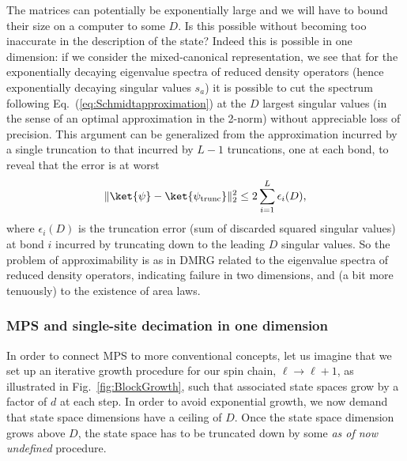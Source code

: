 The matrices can potentially be exponentially large and we will have to bound their size on a computer to some $D$. Is this possible without becoming too inaccurate in the description of the state? Indeed this is possible in one dimension: if we consider the mixed-canonical representation, we see that for the exponentially decaying eigenvalue spectra of reduced density operators (hence exponentially decaying singular values $s_a$) it is possible to cut the spectrum following Eq.~(\ref{eq:Schmidtapproximation}) at the $D$ largest singular values (in the sense of an optimal approximation in the 2-norm) without appreciable loss of precision. This argument can be generalized from the approximation incurred by a single truncation to that incurred by $L-1$ truncations, one at each bond, to reveal that the error is at worst \cite{Verstraete06}
\begin{equation}
\| \ket{\psi} - \ket{\psi_{{\rm trunc}}} \|_2^2 \leq 2 \sum_{i=1}^L \epsilon_i(D) ,
\end{equation}
where $\epsilon_i(D)$ is the truncation error (sum of discarded squared singular values) at bond $i$ incurred by truncating down to the leading $D$ singular values. So the problem of approximability is as in DMRG related to the eigenvalue spectra of reduced density operators, indicating failure in two dimensions, and (a bit more tenuously) to the existence of area laws.

\subsubsection{MPS and single-site decimation in one dimension}
\label{subsubsec:MPSsinglesitedecimation}

In order to connect MPS to more conventional concepts, let us imagine that we set up an iterative growth procedure for our spin chain, $\ell \rightarrow \ell + 1$, as illustrated in Fig.~\ref{fig:BlockGrowth}, such that associated state spaces grow by a factor of $d$ at each step. In order to avoid exponential growth, we now demand that state space dimensions have a ceiling of $D$. Once the state space dimension grows above $D$, the state space has to be truncated down by some {\em as of now undefined} procedure.

